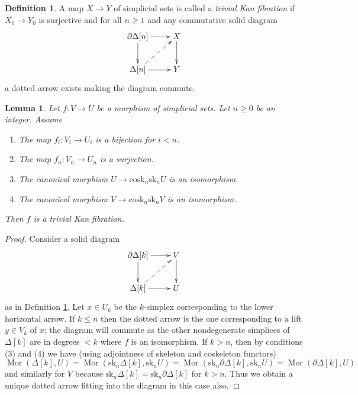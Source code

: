 \documentclass{stacks-project}
\theoremstyle{plain}
\newtheorem{lemma}[subsection]{Lemma}
\theoremstyle{definition}
\newtheorem{definition}[subsection]{Definition}
\theoremstyle{remark}
\numberwithin{equation}{subsection}
\def\Mor{\mathop{\mathrm{Mor}}\nolimits}
\begin{document}
\begin{definition}
\label{definition-trivial-kan}
A map $X \to Y$ of simplicial sets is called a {\it trivial Kan fibration}
if $X_0 \to Y_0$ is surjective and for all $n \geq 1$ and any commutative
solid diagram
$$
\xymatrix{
\partial \Delta[n] \ar[r] \ar[d] & X \ar[d] \\
\Delta[n] \ar[r] \ar@{-->}[ru] & Y
}
$$
a dotted arrow exists making the diagram commute.
\end{definition}

\begin{lemma}
\label{lemma-section}
Let $f : V \to U$ be a morphism of simplicial sets. Let $n \geq 0$ be an
integer. Assume
\begin{enumerate}
\item The map $f_i : V_i \to U_i$ is a bijection for $i < n$.
\item The map $f_n : V_n \to U_n$ is a surjection.
\item The canonical morphism $U \to \text{cosk}_n \text{sk}_n U$
is an isomorphism.
\item The canonical morphism $V \to \text{cosk}_n \text{sk}_n V$
is an isomorphism.
\end{enumerate}
Then $f$ is a trivial Kan fibration.
\end{lemma}

\begin{proof}
Consider a solid diagram
$$
\xymatrix{
\partial \Delta[k] \ar[r] \ar[d] & V \ar[d] \\
\Delta[k] \ar[r] \ar@{-->}[ru] & U
}
$$
as in Definition \ref{definition-trivial-kan}. Let $x \in U_k$ be
the $k$-simplex corresponding to the lower horizontal arrow.
If $k \leq n$ then the dotted arrow is the one corresponding to
a lift $y \in V_k$ of $x$; the diagram will commute as the other
nondegenerate simplices of $\Delta[k]$ are in degrees $< k$ where
$f$ is an isomorphism. If $k > n$, then by conditions (3) and (4)
we have (using adjointness of skeleton and coskeleton functors)
$$
\Mor(\Delta[k], U) =
\Mor(\text{sk}_n\Delta[k], \text{sk}_nU) =
\Mor(\text{sk}_n\partial\Delta[k], \text{sk}_nU) =
\Mor(\partial \Delta[k], U)
$$
and similarly for $V$ because
$\text{sk}_n\Delta[k] = \text{sk}_n\partial\Delta[k]$ for $k > n$.
Thus we obtain a unique dotted arrow fitting into the diagram in
this case also.
\end{proof}
\end{document}

